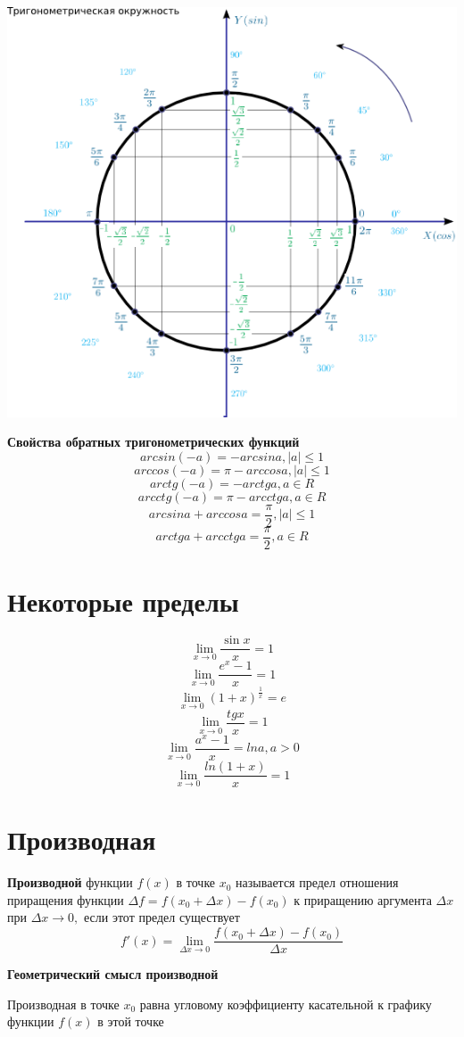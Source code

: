 \documentclass[a5paper, 8pt]{extarticle}
\begin{document}
\begin{center}
\includegraphics[width=0.9\linewidth]{trig_circle2.png}
\end{center}

\textbf{Свойства обратных тригонометрических функций}
$$arcsin(-a)=-arcsin a, |a|\le 1$$
$$arccos(-a)=\pi-arccos a, |a|\le 1$$
$$arctg(-a)=-arctg a, a\in R$$
$$arcctg(-a)=\pi-arcctg a, a\in R$$
$$arcsin a+ arccos a=\frac{\pi}{2}, |a|\le 1$$
$$arctg a+ arcctg a=\frac{\pi}{2}, a\in R$$

\section{Некоторые пределы}
$$\lim\limits_{x\to 0}\frac{\sin x}{x}=1$$
$$\lim\limits_{x\to 0}\frac{e^x-1}{x}=1$$
$$\lim\limits_{x\to 0}(1+x)^{\frac{1}{x}}=e$$
$$\lim\limits_{x\to 0}\frac{tg x}{x}=1$$
$$\lim\limits_{x\to 0}\frac{a^x-1}{x}=ln a, a>0$$
$$\lim\limits_{x\to 0}\frac{ln(1+x)}{x}=1$$

\section{Производная}

\textbf{Производной} функции $f(x)$  в точке $x_0$ называется  предел отношения приращения функции $\Delta f=f(x_0+\Delta x)-f(x_0)$ к приращению аргумента $\Delta x$ при $\Delta x\to 0,$ если этот предел существует
$$
f'(x)=\lim\limits_{\Delta x\to 0}\frac{f(x_0+\Delta x)-f(x_0)}{\Delta x}
$$

\begin{center}
\textbf{Геометрический смысл производной}
\end{center}
Производная в точке $x_0$ равна угловому коэффициенту касательной
к графику функции $f(x)$ в этой точке
\end{document}
